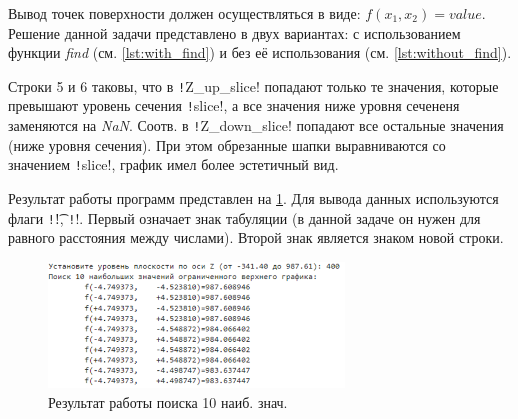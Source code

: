 Вывод точек поверхности должен осуществляться в виде: $f(x_1, x_2) = value$. Решение данной задачи представлено в двух вариантах: с использованием функции \textit{find} (см. \cref{lst:with_find}) и без её использования (см. \cref{lst:without_find}).


Строки 5 и 6 таковы, что в \texttt!Z_up_slice! попадают только те значения, которые превышают уровень сечения \texttt!slice!, а все значения ниже уровня сечененя заменяются на \textit{NaN}. 
Соотв. в \texttt!Z_down_slice! попадают все остальные значения (ниже уровня сечения). 
При этом обрезанные шапки выравниваются со значением \texttt!slice!, график имел более эстетичный вид.


Результат работы программ представлен на \cref{fig:ex3}. Для вывода данных используются флаги \texttt!\t!, \texttt!\n!. Первый означает знак табуляции (в данной задаче он нужен для равного расстояния между числами). Второй знак является знаком новой строки.

\begin{figure}[H]
    \centering
    \includegraphics[width=0.7\textwidth]{figs/ex3.png}
    \caption{Результат работы поиска 10 наиб. знач.}
    \label{fig:ex3}
\end{figure}

